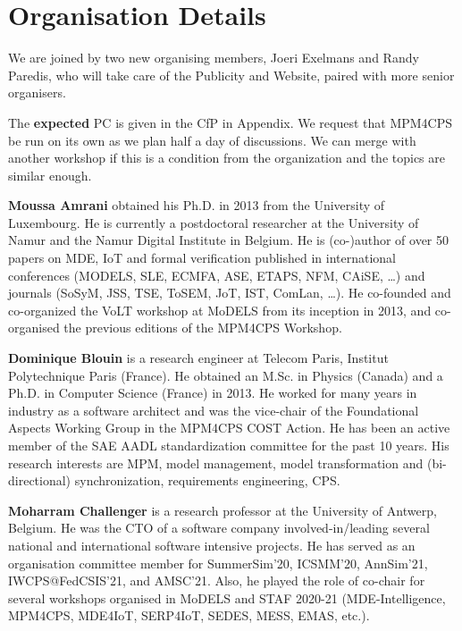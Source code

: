 \section{Organisation Details}
\label{sec:Organisation}

We are joined by two new organising members, Joeri Exelmans and Randy Paredis, 
who will take care of the Publicity and Website, paired with more senior organisers.

The \textbf{expected} PC is given in the CfP in Appendix.
We request that MPM4CPS be run on its own as we plan half a day of discussions.
We can merge with another workshop if this is a condition from the organization 
and the topics are similar enough.

\medskip
\noindent
\textbf{Moussa Amrani} obtained his Ph.D. in 2013 from the University of Luxembourg. 
He is currently a postdoctoral researcher at the University of Namur and the Namur Digital Institute in Belgium. 
He is (co-)author of over 50 papers on MDE, IoT and formal verification published in international conferences (MODELS, SLE, ECMFA, ASE, ETAPS, NFM, CAiSE, \ldots) and journals (SoSyM, JSS, TSE, ToSEM, JoT, IST, ComLan, \ldots). He co-founded and co-organized the VoLT workshop at MoDELS from its inception in 2013, and co-organised
the previous editions of the MPM4CPS Workshop.

\medskip
\noindent
\textbf{Dominique Blouin} is a research engineer at Telecom Paris, Institut Polytechnique Paris 
(France). He obtained an M.Sc. in Physics (Canada) and a Ph.D. in Computer Science (France) in 2013. He worked for many years in industry as a software architect and was the vice-chair of the Foundational Aspects Working Group in the MPM4CPS COST Action. He has been an active member of the SAE AADL standardization committee for the past 10 years. His research interests are MPM, model management, model transformation and (bi-directional) synchronization, requirements engineering, CPS.

\medskip
\noindent
\textbf{Moharram Challenger} is a research professor at the University of Antwerp, Belgium. He was the CTO of a software company involved-in/leading several national and international software intensive projects. He has served as an organisation committee member for SummerSim'20, ICSMM'20, AnnSim'21, IWCPS@FedCSIS'21, and AMSC'21. Also, he played the role of co-chair for several workshops organised in MoDELS and STAF 2020-21 (MDE-Intelligence, MPM4CPS, MDE4IoT, SERP4IoT, SEDES, MESS, EMAS, etc.).

